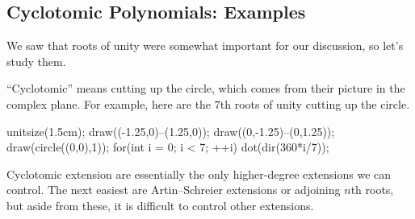 \documentclass[../notes.tex]{subfiles}
\begin{document}
\subsection{Cyclotomic Polynomials: Examples}
We saw that roots of unity were somewhat important for our discussion, so let's study them.
\begin{remark}
	``Cyclotomic'' means cutting up the circle, which comes from their picture in the complex plane. For example, here are the $7$th roots of unity cutting up the circle.
	\begin{center}
		\begin{asy}
			unitsize(1.5cm);
			draw((-1.25,0)--(1.25,0));
			draw((0,-1.25)--(0,1.25));
			draw(circle((0,0),1));
			for(int i = 0; i < 7; ++i)
				dot(dir(360*i/7));
		\end{asy}
	\end{center}
\end{remark}
Cyclotomic extension are essentially the only higher-degree extensions we can control. The next easiest are Artin--Schreier extensions or adjoining $n$th roots, but aside from these, it is difficult to control other extensions.
\end{document}
